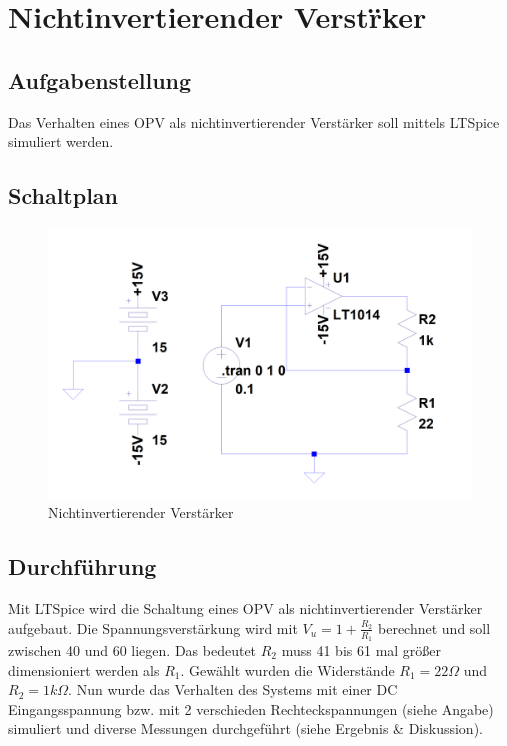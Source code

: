 \documentclass[12pt,a4paper,titlepage]{article}
\begin{document}
\setcounter{page}{2}

\newpage
\setcounter{tocdepth}{1}
\tableofcontents

\newpage



\section{Nichtinvertierender Verst\"rker}

\subsection{Aufgabenstellung}
Das Verhalten eines OPV als nichtinvertierender Verst\"arker soll mittels LTSpice simuliert werden.

\subsection{Schaltplan}
\begin{figure}
  \includegraphics{nichtinvertierend_schaltung}
  \caption{Nichtinvertierender Verst\"arker}
\end{figure}

\subsection{Durchf\"uhrung}
Mit LTSpice wird die Schaltung eines OPV als nichtinvertierender Verst\"arker aufgebaut. Die Spannungsverst\"arkung wird mit $V_u = 1 + \frac{R_2}{R_1}$ berechnet und soll zwischen 40 und 60 liegen. Das bedeutet $R_2$ muss 41 bis 61 mal gr\"o\ss er dimensioniert werden als $R_1$. Gew\"ahlt wurden die Widerst\"ande $R_1 = 22\Omega$ und $R_2 = 1k\Omega$. Nun wurde das Verhalten des Systems mit einer DC Eingangsspannung bzw. mit 2 verschieden Rechteckspannungen (siehe Angabe) simuliert und diverse Messungen durchgef\"uhrt (siehe Ergebnis \& Diskussion).
\end{document}

